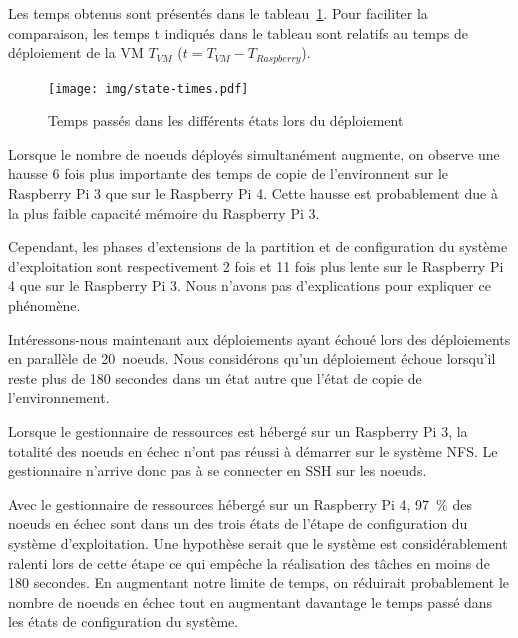 \documentclass[letterpaper, 10 pt, conference]{ieeeconf}
\begin{document}
Les temps obtenus sont présentés dans le tableau~\ref{fig:stime}. Pour faciliter la comparaison, les temps t indiqués dans le tableau sont relatifs au temps de déploiement de la VM $T_{VM}$ ($t = T_{VM} - T_{Raspberry}$).

\begin{figure}[htb]
  \texttt{[image: img/state-times.pdf]}
  \caption{Temps passés dans les différents états lors du déploiement}
  \label{fig:stime}
\end{figure}

Lorsque le nombre de noeuds déployés simultanément augmente, on observe une hausse 6 fois plus importante des temps de copie de l'environnent sur le Raspberry Pi 3 que sur le Raspberry Pi 4. Cette hausse est probablement due à la plus faible capacité mémoire du Raspberry Pi 3.

Cependant, les phases d'extensions de la partition et de configuration du système d'exploitation sont respectivement 2 fois et 11 fois plus lente sur le Raspberry Pi 4 que sur le Raspberry Pi 3. Nous n'avons pas d'explications pour expliquer ce phénomène.

Intéressons-nous maintenant aux déploiements ayant échoué lors des déploiements en parallèle de 20~noeuds. Nous considérons qu'un déploiement échoue lorsqu'il reste plus de 180 secondes dans un état autre que l'état de copie de l'environnement.

Lorsque le gestionnaire de ressources est hébergé sur un Raspberry Pi 3, la totalité des noeuds en échec n'ont pas réussi à démarrer sur le système NFS. Le gestionnaire n'arrive donc pas à se connecter en SSH sur les noeuds.

Avec le gestionnaire de ressources hébergé sur un Raspberry Pi 4, 97~\% des noeuds en échec sont dans un des trois états de l'étape de configuration du système d'exploitation. Une hypothèse serait que le système est considérablement ralenti lors de cette étape ce qui empêche la réalisation des tâches en moins de 180 secondes. En augmentant notre limite de temps, on réduirait probablement le nombre de noeuds en échec tout en augmentant davantage le temps passé dans les états de configuration du système.

\end{document}
